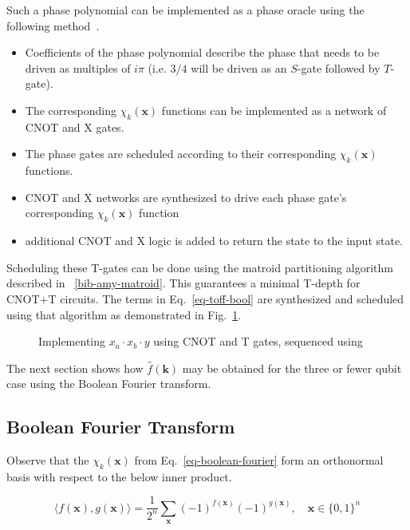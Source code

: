Such a phase polynomial can be implemented as a phase oracle using the following
method~\cite{amy-meet-in-middle}.

\begin{itemize}
\item Coefficients of the phase polynomial describe the phase that needs to be driven
  as multiples of $i\pi$ (i.e. $3/4$ will be driven as an $S$-gate followed by $T$-gate).
\item The corresponding $\chi_k(\mathbf{x})$ functions can be implemented as a network
  of CNOT and X gates.
\item The phase gates are scheduled according to their corresponding $\chi_k(\mathbf{x})$
  functions.
\item CNOT and X networks are synthesized to drive each phase gate's corresponding
  $\chi_k(\mathbf{x})$ function
\item additional CNOT and X logic is added to return the state to the input state.
\end{itemize}

Scheduling these T-gates can be done using the matroid partitioning algorithm described in
~\ref{bib-amy-matroid}. This guarantees a minimal T-depth for CNOT+T circuits.
The terms in Eq.~\ref{eq-toff-bool} are synthesized and scheduled using that algorithm as
demonstrated in Fig.~\ref{fig-toff-mark-matroid}.

\begin{figure}[t]
  \centering
  \scalebox{0.7} {
    
  }
  \caption{Implementing $x_a \cdot x_b \cdot y$ using CNOT and T gates, sequenced using~\cite{bib-amy-matroid}}
  \label{fig-toff-mark-matroid}
\end{figure}

The next section shows how $\hat{f}(\mathbf{k})$ may be obtained for the three or fewer qubit case using the
Boolean Fourier transform.

\subsection{Boolean Fourier Transform}
\label{Pre:Four}
Observe that the $\chi_k(\mathbf{x})$ from Eq.~\ref{eq-boolean-fourier} form an orthonormal basis with respect
to the below inner product.

\begin{equation}
  \label{eq-inner-prod}
  \langle f(\mathbf{x}) , g(\mathbf{x}) \rangle = \frac{1}{2^n} \sum_{\mathbf{x}} (-1)^{f(\mathbf{x})} (-1)^{g(\mathbf{x})}, \quad \mathbf{x} \in \{0,1\}^n
\end{equation}

